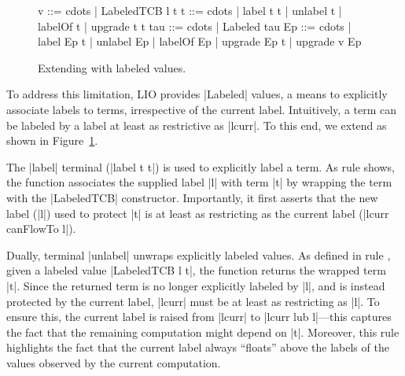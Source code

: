 \begin{figure}[t] %
\small
\begin{code}
v    ::= cdots  | LabeledTCB l t
t    ::= cdots  | label t t | unlabel t | labelOf t | upgrade t t
tau  ::= cdots  | Labeled tau
Ep   ::= cdots  | label Ep t | unlabel Ep | labelOf Ep
                | upgrade Ep t | upgrade v Ep
\end{code}

\caption{Extending \lio{} with labeled values\label{fig:sos:labeled}.}
\end{figure}

 
To address this limitation, LIO provides |Labeled| values, a means to 
explicitly associate labels to terms, irrespective of the current label.
%
Intuitively, a term can be %
labeled by a label at least as restrictive as |lcurr|. 
%
To this end, we extend \lio{} as shown in Figure~\ref{fig:sos:labeled}.

The |label| terminal (|label t t|) is used to explicitly label a term.
%
As rule  shows, the function associates the supplied
label |l| with term |t| by wrapping the term with the |LabeledTCB|
constructor.
%
Importantly, it first asserts that the new label (|l|) used to
protect |t| is at least as restricting as the current label 
(|lcurr canFlowTo l|).
 
Dually, terminal |unlabel| unwraps explicitly labeled values.
%
As defined in rule , given a labeled value
|LabeledTCB l t|, the function returns the wrapped term |t|.
%
Since the returned term is no longer explicitly labeled by |l|, and
is instead protected by the current label, |lcurr| must be at least
as restricting as |l|.
%
To ensure this, the current label is raised from |lcurr| to |lcurr lub
l|---this captures the fact that the remaining computation might
depend on |t|. 
%
Moreover, this rule highlights the fact that the current label always
``floats'' above the labels of the values observed by the current
computation.

